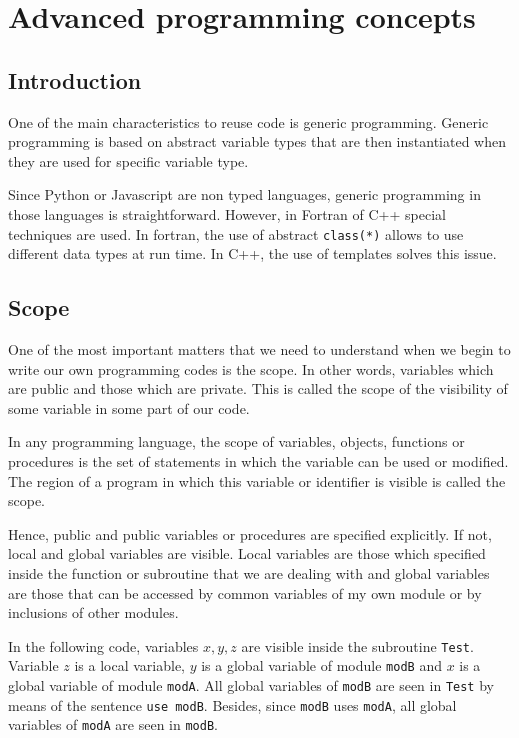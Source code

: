 \chapter{Advanced programming concepts}

 
 
 

 
 
  
\section{Introduction} 
One of the main characteristics to reuse code is generic programming.  
Generic programming is based on abstract variable types that are then instantiated when they are used for specific variable type.

Since Python or Javascript are non typed languages, generic programming in those languages is straightforward. However, in Fortran of C++
special techniques are used. In fortran, the use of abstract  \lstinline{class(*)} allows to use different data types at run time. In C++, the use of templates solves this issue. 
  
  
  
  
 \section{Scope} 
 One of the most important matters that we need to understand when we begin to write our own programming codes is the scope. In other words,  variables which are public and those which are private. This is called the scope of the visibility of some variable in some part of our code. 
 
 In any programming language, the scope of variables, objects, functions or procedures is the set of statements in which the variable can be used or modified. The region of a program in which this variable or identifier is visible is called the scope. 
 
 Hence, public and public variables or procedures are specified explicitly. If not, local and global variables are visible. Local variables are those which specified inside the function or subroutine that we are dealing with and global variables are those that can be accessed by common variables of my own module  or by inclusions of other modules.   
 
 \newpage 
 In the following code,  variables $x, y,z $ are visible inside the subroutine \texttt{Test}.  Variable $ z $ is a local variable, $ y $ is a global variable of module \texttt{modB} and $ x $ is a global variable of module \texttt{modA}.  All global variables of \texttt{modB} are seen in \texttt{Test}  by means of the  sentence \texttt{use modB}. Besides, since \texttt{modB} uses \texttt{modA}, all global variables of \texttt{modA} are seen in \texttt{modB}.   
 \vspace{0.5cm} 
 
